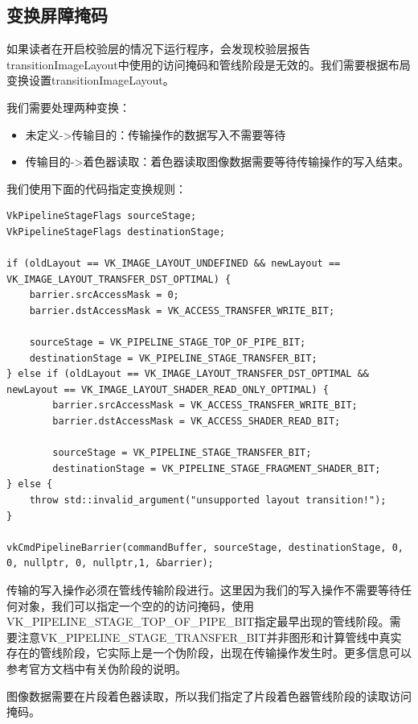 \documentclass{ctexart}
\begin{document}
\subsection{变换屏障掩码}

如果读者在开启校验层的情况下运行程序，会发现校验层报告transitionImageLayout中使用的访问掩码和管线阶段是无效的。我们需要根据布局变换设置transitionImageLayout。

我们需要处理两种变换：

\begin{itemize}
	\item 未定义->传输目的：传输操作的数据写入不需要等待
	\item 传输目的->着色器读取：着色器读取图像数据需要等待传输操作的写入结束。
\end{itemize}

我们使用下面的代码指定变换规则：

\begin{lstlisting}[language={[ANSI]C}]
VkPipelineStageFlags sourceStage;
VkPipelineStageFlags destinationStage;

if (oldLayout == VK_IMAGE_LAYOUT_UNDEFINED && newLayout == VK_IMAGE_LAYOUT_TRANSFER_DST_OPTIMAL) {
	barrier.srcAccessMask = 0;
	barrier.dstAccessMask = VK_ACCESS_TRANSFER_WRITE_BIT;

	sourceStage = VK_PIPELINE_STAGE_TOP_OF_PIPE_BIT;
	destinationStage = VK_PIPELINE_STAGE_TRANSFER_BIT;
} else if (oldLayout == VK_IMAGE_LAYOUT_TRANSFER_DST_OPTIMAL && newLayout == VK_IMAGE_LAYOUT_SHADER_READ_ONLY_OPTIMAL) {
		barrier.srcAccessMask = VK_ACCESS_TRANSFER_WRITE_BIT;
		barrier.dstAccessMask = VK_ACCESS_SHADER_READ_BIT;

		sourceStage = VK_PIPELINE_STAGE_TRANSFER_BIT;
		destinationStage = VK_PIPELINE_STAGE_FRAGMENT_SHADER_BIT;
} else {
	throw std::invalid_argument("unsupported layout transition!");
}

vkCmdPipelineBarrier(commandBuffer, sourceStage, destinationStage, 0, 0, nullptr, 0, nullptr,1, &barrier);
\end{lstlisting}

传输的写入操作必须在管线传输阶段进行。这里因为我们的写入操作不需要等待任何对象，我们可以指定一个空的的访问掩码，使用VK\_PIPELINE\_STAGE\_TOP\_OF\_PIPE\_BIT指定最早出现的管线阶段。需要注意VK\_PIPELINE\_STAGE\_TRANSFER\_BIT并非图形和计算管线中真实存在的管线阶段，它实际上是一个伪阶段，出现在传输操作发生时。更多信息可以参考官方文档中有关伪阶段的说明。

图像数据需要在片段着色器读取，所以我们指定了片段着色器管线阶段的读取访问掩码。
\end{document}
